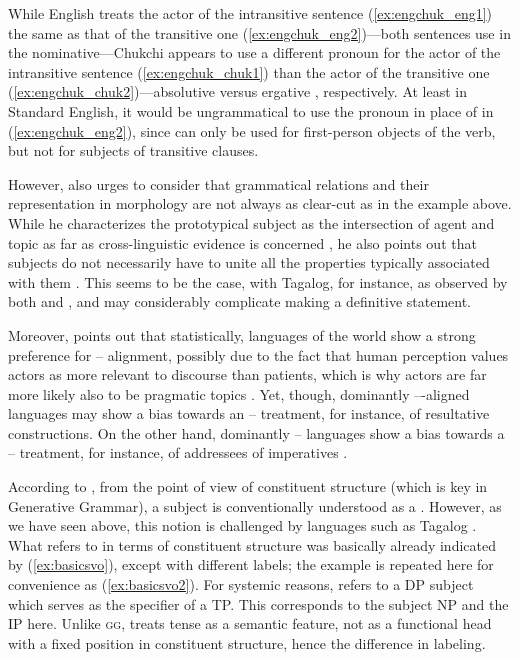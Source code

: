 \xe

While English treats the actor of the intransitive sentence
(\ref{ex:engchuk_eng1}) the same as that of the transitive one
(\ref{ex:engchuk_eng2})---both sentences use  in the nominative---Chukchi
appears to use a different pronoun for the actor of the intransitive sentence
(\ref{ex:engchuk_chuk1}) than the actor of the transitive one
(\ref{ex:engchuk_chuk2})---absolutive  versus ergative ,
respectively. At least in Standard English, it would be ungrammatical to use
the pronoun  in place of  in (\ref{ex:engchuk_eng2}), since
 can only be used for first-person objects of the verb, but not for
subjects of transitive clauses.

However, \citet{comrie1989} also urges to consider that grammatical relations
and their representation in morphology are not always as clear-cut as in the
example above. While he characterizes the prototypical subject as the
intersection of agent and topic as far as cross-linguistic evidence is
concerned \citep[107]{comrie1989}, he also points out that subjects do not
necessarily have to unite all the properties typically associated with them
\citep[110]{comrie1989}. This seems to be the case, with Tagalog, for instance,
as observed by both \citet{schachter1976} and \citet{kroeger1991}, and may
considerably complicate making a definitive statement.

Moreover, \citet{comrie1989} points out that statistically, languages of the
world show a strong preference for \Nom{}--\Acc{} alignment, possibly due to
the fact that human perception values actors as more relevant to discourse than
patients, which is why actors are far more likely also to be pragmatic topics
\citep[120]{comrie1989}. Yet, though, dominantly \Nom{}--\Acc{}-aligned
languages may show a bias towards an \Erg{}--\Abs{} treatment, for instance, of
resultative constructions. On the other hand, dominantly \Erg{}--\Abs{}
languages show a bias towards a \Nom{}--\Acc{} treatment, for instance, of
addressees of imperatives \citep[116--119]{comrie1989}.

According to \citet{carnie2013}, from the point of view of constituent
structure (which is key in Generative Grammar), a subject is conventionally
understood as a . However, as
we have seen above, this notion is challenged by languages such as Tagalog
\citep[225]{kroeger1991}. What \citet{carnie2013} refers to in terms of
constituent structure was basically already indicated by (\ref{ex:basicsvo}),
except with different labels; the example is repeated here for convenience as
(\ref{ex:basicsvo2}). For systemic reasons, \citet{carnie2013} refers to a DP
subject which serves as the specifier of a TP. This corresponds to the subject
NP and the IP here. Unlike \textsc{gg}, \Lfg{} treats tense as a semantic
feature, not as a functional head with a fixed position in constituent
structure, hence the difference in labeling.

